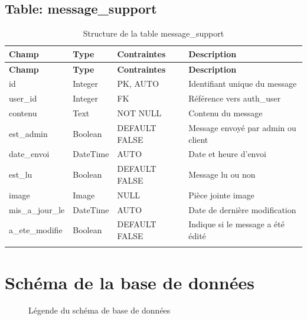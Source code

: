 \documentclass[12pt,a4paper]{report}
\begin{document}
\subsection{Table: message\_support}
\begin{longtable}{|p{3.5cm}|p{2.5cm}|p{2cm}|p{6cm}|}
\hline
\rowcolor{banquiseblue!30}
\textbf{Champ} & \textbf{Type} & \textbf{Contraintes} & \textbf{Description} \\
\hline
\endfirsthead
\hline
\rowcolor{banquiseblue!30}
\textbf{Champ} & \textbf{Type} & \textbf{Contraintes} & \textbf{Description} \\
\hline
\endhead

id & Integer & PK, AUTO & Identifiant unique du message \\
\hline
user\_id & Integer & FK & Référence vers auth\_user \\
\hline
contenu & Text & NOT NULL & Contenu du message \\
\hline
est\_admin & Boolean & DEFAULT FALSE & Message envoyé par admin ou client \\
\hline
date\_envoi & DateTime & AUTO & Date et heure d'envoi \\
\hline
est\_lu & Boolean & DEFAULT FALSE & Message lu ou non \\
\hline
image & Image & NULL & Pièce jointe image \\
\hline
mis\_a\_jour\_le & DateTime & AUTO & Date de dernière modification \\
\hline
a\_ete\_modifie & Boolean & DEFAULT FALSE & Indique si le message a été édité \\
\hline

\caption{Structure de la table message\_support}
\end{longtable}

\section{Schéma de la base de données}

\begin{figure}[H]
\centering
{}
\caption{Légende du schéma de base de données}
\end{figure}
\end{document}
